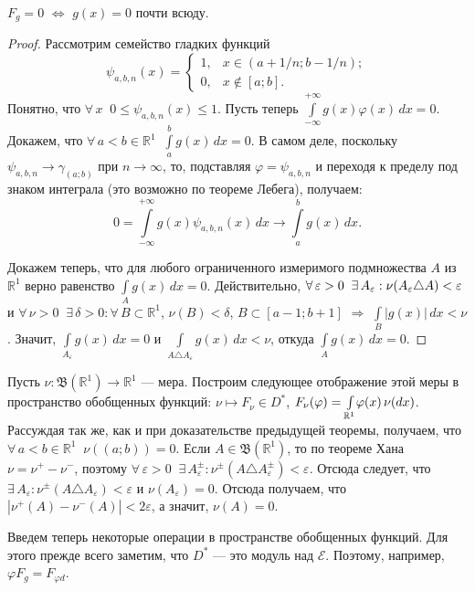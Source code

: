 \documentclass[12pt,titlepage, a4paper]{article}
\begin{document}
\lecture

\begin{predl}
$F_g=0$ $\Leftrightarrow$ $g(x)=0$ почти всюду.
\end{predl}

\begin{proof}
Рассмотрим семейство гладких функций $$ \psi_{a,b,n}(x)=
\begin{cases}
1,&\text{$x\in(a+1/n; b-1/n)$};\\
0,&\text{$x\not\in[a;b]$}.
\end{cases}$$
Понятно, что $\forall\,x\;\; 0\leqslant\psi_{a,b,n}(x)\leqslant1$.
Пусть теперь
$\int\limits_{-\infty}^{+\infty}\!g(x)\varphi(x)\,dx=0$. Докажем,
что $\forall\,a<b\in\mathbb{R}^1\;\;\int\limits_{a}^b\!g(x)\,dx=0$.
В самом деле, поскольку $\psi_{a,b,n}\to\gamma_{(a;b)}$ при
$n\to\infty$, то, подставляя $\varphi=\psi_{a,b,n}$ и переходя к
пределу под знаком интеграла (это возможно по теореме Лебега),
получаем:
$$0=\int\limits_{-\infty}^{+\infty}\!g(x)\psi_{a,b,n}(x)\,dx\to\int\limits_a^b\!
g(x)\,dx.$$

Докажем теперь, что для любого ограниченного измеримого подмножества
$A$ из $\mathbb{R}^1$ верно равенство $\int\limits_A\!g(x)\,dx=0$.
Действительно,
$\forall\,\varepsilon\p>0\;\;\exists\,A_\varepsilon:\nu(A_\varepsilon\triangle
A)<\varepsilon$ и
$\forall\,\nu>0\;\;\exists\,\delta>0:\forall\,B\subset
\mathbb{R}^1$, $\nu(B)<\delta$, $B\subset[a-1;b+1]$ $\Rightarrow$
$\int\limits_{B}\!|g(x)|\,dx<\nu$. Значит,
$\int\limits_{A_\varepsilon}\!g(x)\,dx=0$ и $\int\limits_{A\triangle
A_\varepsilon}\!g(x)\,dx<\nu$, откуда $\int\limits_A\!g(x)\,dx=0$.
\end{proof}

Пусть $\nu\colon\mathfrak{B}(\mathbb{R}^1)\to\mathbb{R}^1$ --- мера.
Построим следующее отображение этой меры в пространство обобщенных
функций: $\nu\mapsto F_\nu\in D^*$,
$F_\nu(\varphi)\p=\int\limits_{\mathbb{R}^1}\!\varphi(x)\,\nu(dx)$.
Рассуждая так же, как и при доказательстве предыдущей теоремы,
получаем, что $\forall\,a<b\in\mathbb{R}^1\;\;\nu((a;b))=0$. Если
$A\in\mathfrak{B}(\mathbb{R}^1)$, то по теореме Хана
$\nu=\nu^+-\nu^-$, поэтому
$\forall\,\varepsilon>0\;\;\exists\,A^{\pm}_\varepsilon:\nu^\pm(A\triangle
A^\pm_\varepsilon)<\varepsilon$. Отсюда следует, что
$\exists\,A_\varepsilon:\nu^\pm(A\triangle
A_\varepsilon)<\varepsilon$ и $\nu(A_\varepsilon)=0$. Отсюда
получаем, что $|\nu^+(A)-\nu^-(A)|<2\varepsilon$, а значит,
$\nu(A)=0$.

Введем теперь некоторые операции в пространстве обобщенных
фун\-кций. Для этого прежде всего заметим, что $D^*$ --- это модуль
над $\mathcal{E}$. Поэтому, например, $\varphi F_g=F_{\varphi d}$.
\end{document}
